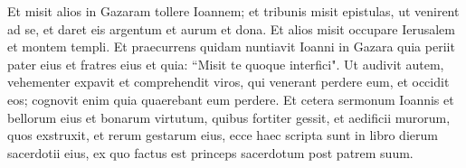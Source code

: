 \begin{biblechapter}
\verse Et misit alios in Gazaram tollere Ioannem; et tribunis misit epistulas, ut venirent ad se, et daret eis argentum et aurum et dona. 
\verse Et alios misit occupare Ierusalem et montem templi.  
\verse Et praecurrens quidam nuntiavit Ioanni in Gazara quia periit pater eius et fratres eius et quia: “Misit te quoque interfici". 
\verse Ut audivit autem, vehementer expavit et comprehendit viros, qui venerant perdere eum, et occidit eos; cognovit enim quia quaerebant eum perdere. 
\verse Et cetera sermonum Ioannis et bellorum eius et bonarum virtutum, quibus fortiter gessit, et aedificii murorum, quos exstruxit, et rerum gestarum eius, 
\verse ecce haec scripta sunt in libro dierum sacerdotii eius, ex quo factus est princeps sacerdotum post patrem suum.
\end{biblechapter}
